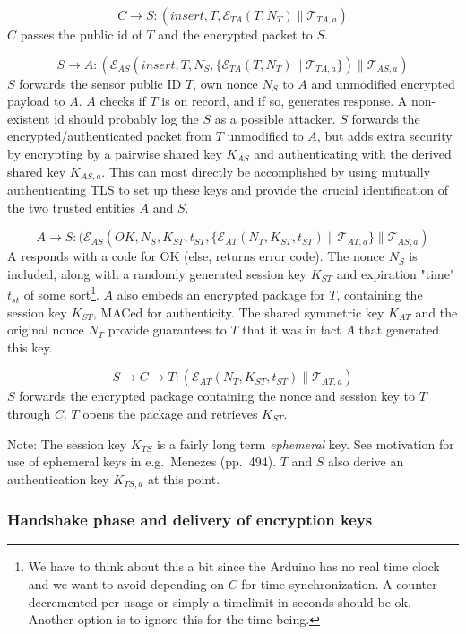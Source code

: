 \[
C\rightarrow S: (insert,T,\mathcal{E}_{TA}(T,N_T) \parallel \mathcal{T}_{TA,a})
\]
$C$ passes the public id of $T$ and the encrypted packet to $S$.

\[
S \rightarrow A: (\mathcal{E}_{AS}(insert,T,N_S, \{ \mathcal{E}_{TA}(T,N_T) \parallel \mathcal{T}_{TA,a} \}) \parallel \mathcal{T}_{AS,a})
\]
$S$ forwards the sensor public ID $T$, own nonce $N_S$ to $A$ and unmodified encrypted payload to $A$. $A$ checks if $T$ is on record, and if so, generates response. A non-existent id should probably log the $S$ as a possible attacker. 
%
$S$ forwards the encrypted/authenticated packet from $T$ unmodified to $A$, but adds extra security by encrypting by a pairwise shared key $K_{AS}$ and authenticating with the derived shared key $K_{AS,a}$. This can most directly be accomplished by using mutually authenticating TLS to set up these keys and provide the crucial identification of the two trusted entities $A$ and $S$.

\[
A \rightarrow S: (\mathcal{E}_{AS}(OK,N_S,K_{ST},t_{ST}, \{ \mathcal{E}_{AT}(N_T,K_{ST},t_{ST}) \parallel \mathcal{T}_{AT,a} \} \parallel \mathcal{T}_{AS,a})
\]
A responds with a code for OK (else, returns error code). The nonce $N_S$ is included, along with a randomly generated session key $K_{ST}$ and expiration "time" $t_{st}$ of some sort\footnote{We have to think about this a bit since the Arduino has no real time clock and we want to avoid depending on $C$ for time synchronization. A counter decremented per usage or simply a timelimit in seconds should be ok. Another option is to ignore this for the time being.}. $A$ also embeds an encrypted package for $T$, containing the session key $K_{ST}$, MACed for authenticity. The shared symmetric key $K_{AT}$ and the original nonce $N_T$ provide guarantees to $T$ that it was in fact $A$ that generated this key.

\[
S \rightarrow C \rightarrow T: (\mathcal{E}_{AT}(N_T,K_{ST},t_{ST}) \parallel \mathcal{T}_{AT,a})
\]
$S$ forwards the encrypted package containing the nonce and session key to $T$ through $C$. $T$ opens the package and retrieves $K_{ST}$. 

Note: The session key $K_{TS}$ is a fairly long term \textit{ephemeral} key. See motivation for use of ephemeral keys in e.g.\ Menezes (pp.\ 494). $T$ and $S$ also derive an authentication key $K_{TS,a}$ at this point.

\subsubsection{Handshake phase and delivery of encryption keys}

